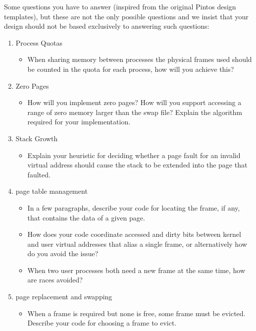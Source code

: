 Some questions you have to answer (inspired from the original Pintos design templates), but these are not the only possible questions and we insist that your design should not be based exclusively to answering such questions:
\begin{enumerate}
    \item Process Quotas
        \begin{itemize}
            \item When sharing memory between processes the physical frames used should be counted in the quota for each process, how will you achieve this?
        \end{itemize}
				
	  \item Zero Pages
        \begin{itemize}
            \item How will you implement zero pages? How will you support accessing a range of zero memory larger than the swap file? Explain the algorithm required for your implementation.
        \end{itemize}			
				
		\item Stack Growth
        \begin{itemize}
            \item Explain your heuristic for deciding whether a page fault for an invalid virtual address should cause the stack to be extended into the page that faulted. 
        \end{itemize}		

    \item page table management
        \begin{itemize}
            \item In a few paragraphs, describe your code for locating the frame, if any, that contains the data of a given page.
            
            \item How does your code coordinate accessed and dirty bits between kernel and user virtual addresses that alias a single frame, or alternatively how do you avoid the issue?
            
            \item When two user processes both need a new frame at the same time, how are races avoided?
        \end{itemize}
    
    \item page replacement and swapping
        \begin{itemize}
            \item When a frame is required but none is free, some frame must be evicted.  Describe your code for choosing a frame to evict.
            

\end{itemize}
\end{enumerate}
